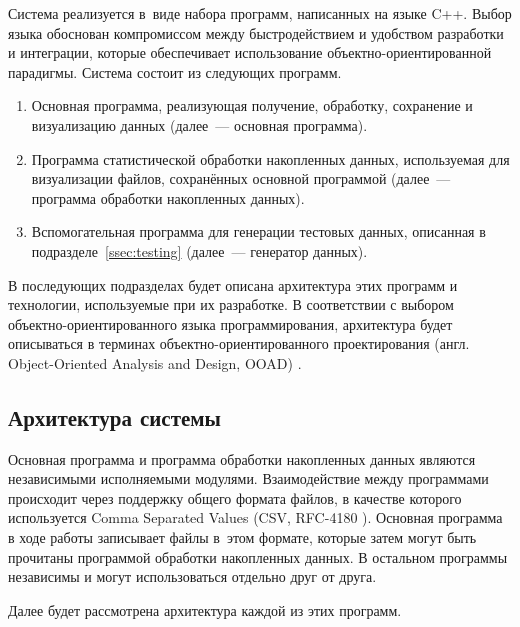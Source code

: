 \documentclass[a4paper, 14pt]{extarticle}
\newcommand{\eng}[1]{{\English #1}}
\begin{document}
  Система реализуется в~виде набора программ, написанных на языке C++. Выбор языка обоснован
  компромиссом между быстродействием и удобством разработки и интеграции, которые обеспечивает
  использование объектно-ориентированной парадигмы. Система состоит из следующих программ.

  \begin{enumerate}
    \item Основная программа, реализующая получение, обработку, сохранение и визуализацию данных
      (далее~--- основная программа).
    \item Программа статистической обработки накопленных данных, используемая для визуализации
      файлов, сохранённых основной программой (далее~--- программа обработки накопленных данных).
    \item Вспомогательная программа для генерации тестовых данных, описанная в подразделе~\ref{ssec:testing}
      (далее~--- генератор данных).
  \end{enumerate}

  В последующих подразделах будет описана архитектура этих программ и технологии, используемые при их
  разработке. В соответствии с выбором объектно-ориентированного языка программирования, архитектура будет описываться в
  терминах объектно-ориентированного проектирования (англ. \eng{Object-Oriented Analysis and Design,
  OOAD}) \cite{booch-ooad}.

  \subsection{Архитектура системы}

  Основная программа и программа обработки накопленных данных являются независимыми исполняемыми
  модулями. Взаимодействие между программами происходит через поддержку общего формата файлов, в
  качестве которого используется \eng{Comma Separated Values} (CSV, RFC-4180 \cite{rfc4180}).
  Основная программа в ходе работы записывает файлы в~этом формате, которые затем могут быть прочитаны
  программой обработки накопленных данных. В остальном программы независимы и могут использоваться
  отдельно друг от друга.

  Далее будет рассмотрена архитектура каждой из этих программ.

\end{document}

